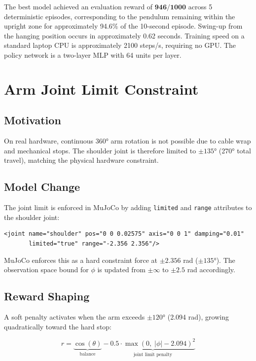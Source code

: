 \documentclass[12pt,a4paper]{article}
\begin{document}
\noindent The best model achieved an evaluation reward of $\mathbf{946 / 1000}$
across 5 deterministic episodes, corresponding to the pendulum remaining within
the upright zone for approximately 94.6\% of the 10-second episode.
Swing-up from the hanging position occurs in approximately 0.62 seconds.
Training speed on a standard laptop CPU is approximately 2100 steps/s,
requiring no GPU. The policy network is a two-layer MLP with 64 units per layer.

\section{Arm Joint Limit Constraint}

\subsection{Motivation}

On real hardware, continuous 360° arm rotation is not possible due to cable
wrap and mechanical stops. The shoulder joint is therefore limited to
$\pm135°$ (270° total travel), matching the physical hardware constraint.

\subsection{Model Change}

The joint limit is enforced in MuJoCo by adding \texttt{limited} and
\texttt{range} attributes to the shoulder joint:

\begin{lstlisting}[style=xml]
<joint name="shoulder" pos="0 0 0.02575" axis="0 0 1" damping="0.01"
       limited="true" range="-2.356 2.356"/>
\end{lstlisting}

\noindent MuJoCo enforces this as a hard constraint force at $\pm2.356$ rad
($\pm135°$). The observation space bound for $\phi$ is updated from $\pm\infty$
to $\pm2.5$ rad accordingly.

\subsection{Reward Shaping}

A soft penalty activates when the arm exceeds $\pm120°$ (2.094 rad), growing
quadratically toward the hard stop:

\begin{equation}
r = \underbrace{\cos(\theta)}_{\text{balance}}
  - \underbrace{0.5 \cdot \max(0,\; |\phi| - 2.094)^2}_{\text{joint limit penalty}}
\end{equation}
\end{document}
